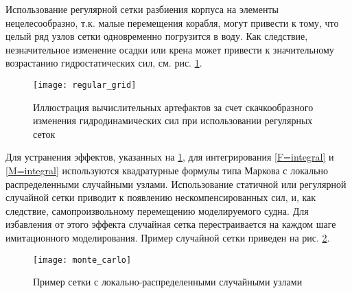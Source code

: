 


Использование регулярной сетки разбиения корпуса на элементы нецелесообразно, т.к. малые перемещения корабля, могут привести к тому, что целый ряд узлов сетки одновременно погрузится в воду. Как следствие, незначительное изменение осадки или крена может привести к значительному возрастанию гидростатических сил, см. рис. \ref{regular_grid}.

\begin{figure}[ht]
\begin{center}
\texttt{[image: regular\_grid]}
\end{center}
\caption{Иллюстрация вычислительных артефактов за счет скачкообразного изменения гидродинамических сил при использовании регулярных сеток}
\label{regular_grid}
\end{figure}

Для устранения эффектов, указанных на \ref{regular_grid}, для интегрирования \eqref{F=integral} и \eqref{M=integral} используются квадратурные формулы типа Маркова с локально распределенными случайными узлами. Использование статичной или регулярной случайной сетки приводит к появлению нескомпенсированных сил, и, как следствие, самопроизвольному перемещению моделируемого судна. Для избавления от этого эффекта случайная сетка перестраивается на каждом шаге имитационного моделирования. Пример случайной сетки приведен на рис. \ref{monte_carlo}.

\begin{figure}[ht]
\begin{center}
\texttt{[image: monte\_carlo]}
\end{center}
\caption{Пример сетки с локально-распределенными случайными узлами}
\label{monte_carlo}
\end{figure}

